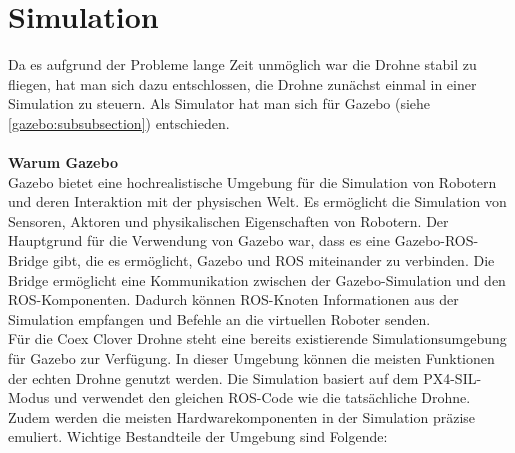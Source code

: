 


\section{Simulation} \label{simulation:section}
Da es aufgrund der Probleme lange Zeit unmöglich war die Drohne stabil zu fliegen, hat man  sich dazu entschlossen, die Drohne zunächst einmal in einer Simulation zu steuern. Als Simulator hat man sich für Gazebo (siehe \ref{gazebo:subsubsection}) entschieden. \\
\\
\textbf{Warum Gazebo} \\
Gazebo bietet eine hochrealistische Umgebung für die Simulation von Robotern und deren Interaktion mit der physischen Welt. Es ermöglicht die Simulation von Sensoren, Aktoren und physikalischen Eigenschaften von Robotern. Der Hauptgrund für die Verwendung von Gazebo war, dass es eine Gazebo-ROS-Bridge gibt, die es ermöglicht, Gazebo und ROS miteinander zu verbinden. Die Bridge ermöglicht eine Kommunikation zwischen der Gazebo-Simulation und den ROS-Komponenten. Dadurch können ROS-Knoten Informationen aus der Simulation empfangen und Befehle an die virtuellen Roboter senden. \\

Für die Coex Clover Drohne steht eine bereits existierende Simulationsumgebung für Gazebo zur Verfügung. In dieser Umgebung können die meisten Funktionen der echten Drohne genutzt werden. Die Simulation basiert auf dem PX4-SIL-Modus und verwendet den gleichen ROS-Code wie die tatsächliche Drohne. Zudem werden die meisten Hardwarekomponenten in der Simulation präzise emuliert. Wichtige Bestandteile der Umgebung sind Folgende:

